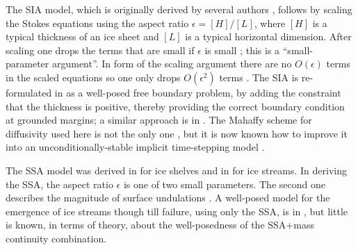 \documentclass[letterpaper,final,12pt,reqno]{amsart}
\newcommand{\eps}{\epsilon}
\begin{document}
The SIA model, which is originally derived by several authors \cite{FowlerLarson1978,Hutter,MorlandJohnson}, follows by scaling the Stokes equations using the aspect ratio $\eps = [H]/[L]$, where $[H]$ is a typical thickness of an ice sheet and $[L]$ is a typical horizontal dimension.  After scaling one drops the terms that are small if $\eps$ is small \cite{Fowler,Hutter}; this is a ``small-parameter argument''.  In form of the scaling argument there are no $O(\eps)$ terms in the scaled equations so one only drops $O(\eps^2)$ terms \cite{Fowler}.  The SIA is re-formulated in \cite{JouvetBueler2012} as a well-posed free boundary problem, by adding the constraint that the thickness is positive, thereby providing the correct boundary condition at grounded margins; a similar approach is in \cite{Bueler2016}.  The Mahaffy \cite{Mahaffy} scheme for diffusivity used here is not the only one \cite{HindmarshPayne}, but it is now known how to improve it into an unconditionally-stable implicit time-stepping model \cite{Bueler2016}.

The SSA model \cite{WeisGreveHutter} was derived in \cite{Morland} for ice shelves and in \cite{MacAyeal} for ice streams.  In deriving the SSA, the aspect ratio $\eps$ is one of two small parameters.  The second one describes the magnitude of surface undulations \cite{SchoofStream,SchoofHindmarsh}.  A well-posed model for the emergence of ice streams though till failure, using only the SSA, is in \cite{SchoofStream}, but little is known, in terms of theory, about the well-posedness of the SSA+mass continuity combination.
\end{document}
